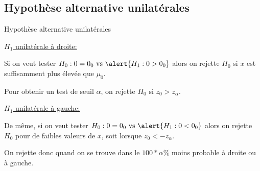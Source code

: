 \documentclass{BeamerTemplate}
\begin{document}
\subsection{Hypothèse alternative unilatérales}

\begin{frame}[t]{Hypothèse alternative unilatérales}

{\small
\underline{$H_1$ unilatérale à droite:}

Si on veut tester $H_0 : \mu = \mu_0 \mbox{ vs } \alert{H_1 : \mu > \mu_0}$ alors on rejette $H_0$ si $\overline{x}$ est suffisamment plus élevée que $\mu_0$.

\medskip
Pour obtenir un  test de seuil $\alpha$, on rejette $H_0$ si \alert{$z_0>z_\alpha$}.

\medskip

\underline{$H_1$ unilatérale à gauche:}

De même, si on veut tester $H_0 : \mu = \mu_0 \mbox{ vs }\alert{H_1 : \mu < \mu_0}$ alors on rejette $H_0$ pour de faibles valeurs de $\overline{x}$, soit lorsque \alert{$z_0<-z_\alpha$}.
}

\bigskip

On rejette donc quand on se trouve dans le $100*\alpha\%$ moins probable à droite ou à gauche.
\end{frame}
\end{document}
